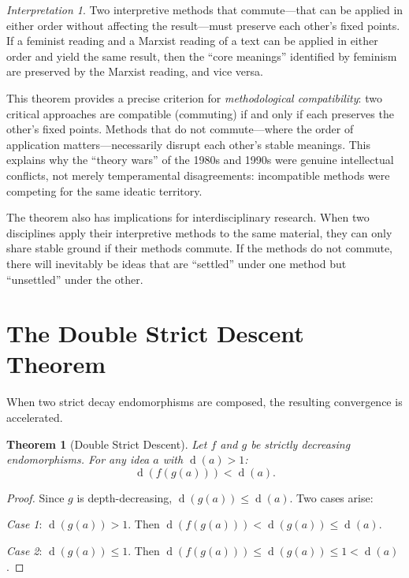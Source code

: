 \documentclass[11pt,openany]{book}
\theoremstyle{definition}
\theoremstyle{plain}
\newtheorem{theorem}[axiom]{Theorem}
\theoremstyle{remark}
\newtheorem{interpretation}[axiom]{Interpretation}
\newcommand{\depth}{\operatorname{d}}       %
\begin{document}
\begin{interpretation}
Two interpretive methods that commute---that can be applied in either order without affecting the result---must preserve each other's fixed points. If a feminist reading and a Marxist reading of a text can be applied in either order and yield the same result, then the ``core meanings'' identified by feminism are preserved by the Marxist reading, and vice versa.

This theorem provides a precise criterion for \emph{methodological compatibility}: two critical approaches are compatible (commuting) if and only if each preserves the other's fixed points. Methods that do not commute---where the order of application matters---necessarily disrupt each other's stable meanings. This explains why the ``theory wars'' of the 1980s and 1990s were genuine intellectual conflicts, not merely temperamental disagreements: incompatible methods were competing for the same ideatic territory.

The theorem also has implications for interdisciplinary research. When two disciplines apply their interpretive methods to the same material, they can only share stable ground if their methods commute. If the methods do not commute, there will inevitably be ideas that are ``settled'' under one method but ``unsettled'' under the other.
\end{interpretation}

\section{The Double Strict Descent Theorem}

When two strict decay endomorphisms are composed, the resulting convergence is accelerated.

\begin{theorem}[Double Strict Descent]
\label{thm:double-descent}
Let $f$ and $g$ be strictly decreasing endomorphisms. For any idea $a$ with $\depth(a) > 1$:
\[
\depth(f(g(a))) < \depth(a).
\]
\end{theorem}

\begin{proof}
Since $g$ is depth-decreasing, $\depth(g(a)) \leq \depth(a)$. Two cases arise:

\emph{Case 1}: $\depth(g(a)) > 1$. Then $\depth(f(g(a))) < \depth(g(a)) \leq \depth(a)$.

\emph{Case 2}: $\depth(g(a)) \leq 1$. Then $\depth(f(g(a))) \leq \depth(g(a)) \leq 1 < \depth(a)$.
\end{proof}
\end{document}
